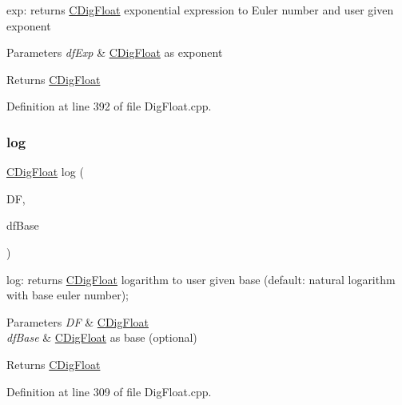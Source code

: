 exp\+: returns \hyperlink{classCDigFloat}{C\+Dig\+Float} exponential expression to Euler number and user given exponent 


\begin{DoxyParams}{Parameters}
{\em df\+Exp} & \hyperlink{classCDigFloat}{C\+Dig\+Float} as exponent \\
\hline
\end{DoxyParams}
\begin{DoxyReturn}{Returns}
\hyperlink{classCDigFloat}{C\+Dig\+Float} 
\end{DoxyReturn}


Definition at line 392 of file Dig\+Float.\+cpp.

\mbox{\label{classCDigFloat_a25031604af1e6356848a9ac84c209903}} 
\subsubsection{\texorpdfstring{log}{log}}
{\footnotesize\ttfamily \hyperlink{classCDigFloat}{C\+Dig\+Float} log (\begin{DoxyParamCaption}\item[{const \hyperlink{classCDigFloat}{C\+Dig\+Float} \&}]{DF,  }\item[{const \hyperlink{classCDigFloat}{C\+Dig\+Float} \&}]{df\+Base }\end{DoxyParamCaption})\hspace{0.3cm}{\ttfamily [friend]}}



log\+: returns \hyperlink{classCDigFloat}{C\+Dig\+Float} logarithm to user given base (default\+: natural logarithm with base euler number); 


\begin{DoxyParams}{Parameters}
{\em DF} & \hyperlink{classCDigFloat}{C\+Dig\+Float} \\
\hline
{\em df\+Base} & \hyperlink{classCDigFloat}{C\+Dig\+Float} as base (optional) \\
\hline
\end{DoxyParams}
\begin{DoxyReturn}{Returns}
\hyperlink{classCDigFloat}{C\+Dig\+Float} 
\end{DoxyReturn}


Definition at line 309 of file Dig\+Float.\+cpp.

\mbox{\label{classCDigFloat_ac5877d13039d236858e1cb04351f0a86}} 
